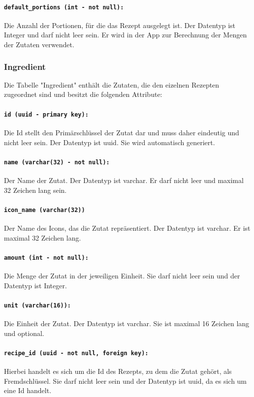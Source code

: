 \documentclass{entwurfsheft}
\begin{document}
\paragraph{\texttt{default\_portions (int - not null):}} Die Anzahl der Portionen, für die das Rezept ausgelegt ist. Der Datentyp ist Integer und darf nicht leer sein. Er wird in der App zur Berechnung der Mengen der Zutaten verwendet.
\newpage
\subsubsection{Ingredient}
Die Tabelle "Ingredient" enthält die Zutaten, die den eizelnen Rezepten zugeordnet sind und besitzt die folgenden Attribute:
\paragraph{\texttt{id (uuid - primary key):}} Die Id stellt den Primärschlüssel der Zutat dar und muss daher eindeutig und nicht leer sein. Der Datentyp ist \Gls{uuid}. Sie wird automatisch generiert.
\paragraph{\texttt{name (varchar(32) - not null):}} Der Name der Zutat. Der Datentyp ist \Gls{varchar}. Er darf nicht leer und maximal 32 Zeichen lang sein.
\paragraph{\texttt{icon\_name (varchar(32))}} Der Name des Icons, das die Zutat repräsentiert. Der Datentyp ist \Gls{varchar}. Er ist maximal 32 Zeichen lang.
\paragraph{\texttt{amount (int - not null):}} Die Menge der Zutat in der jeweiligen Einheit. Sie darf nicht leer sein und der Datentyp ist Integer.
\paragraph{\texttt{unit (varchar(16)):}} Die Einheit der Zutat. Der Datentyp ist \Gls{varchar}. Sie ist maximal 16 Zeichen lang und optional.
\paragraph{\texttt{recipe\_id (uuid - not null, foreign key):}} Hierbei handelt es sich um die Id des Rezepts, zu dem die Zutat gehört, als Fremdschlüssel. Sie darf nicht leer sein und der Datentyp ist \Gls{uuid}, da es sich um eine Id handelt.
\newpage
\end{document}
